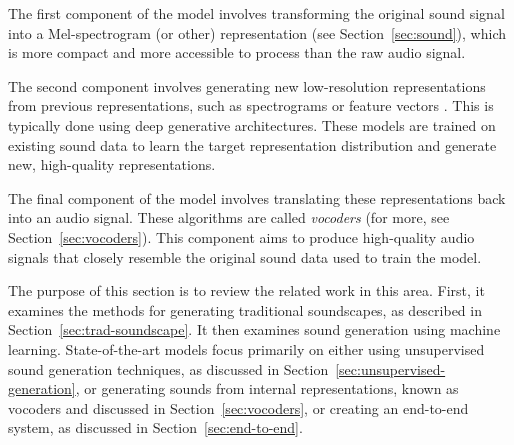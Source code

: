 The first component of the model involves transforming the original sound signal into a Mel-spectrogram (or other) representation (see Section~\ref{sec:sound}), which is more compact and more accessible to process than the raw audio signal.

The second component involves generating new low-resolution representations from previous representations, such as spectrograms or feature vectors \cite{kong_hifi-gan_2020}. This is typically done using deep generative architectures. These models are trained on existing sound data to learn the target representation distribution and generate new, high-quality representations.

The final component of the model involves translating these representations back into an audio signal. These algorithms are called \textit{vocoders} (for more, see Section~\ref{sec:vocoders}). This component aims to produce high-quality audio signals that closely resemble the original sound data used to train the model.

The purpose of this section is to review the related work in this area. First, it examines the methods for generating traditional soundscapes, as described in Section~\ref{sec:trad-soundscape}. It then examines sound generation using machine learning. State-of-the-art models focus primarily on either using unsupervised sound generation techniques, as discussed in Section~\ref{sec:unsupervised-generation}, or generating sounds from internal representations, known as vocoders and discussed in Section~\ref{sec:vocoders}, or creating an end-to-end system, as discussed in Section~\ref{sec:end-to-end}.




